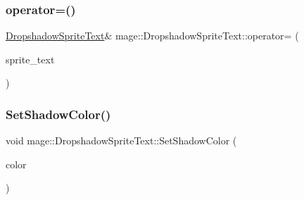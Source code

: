 \hypertarget{classmage_1_1_dropshadow_sprite_text_a8f2ff9363c2710d03c87d45de6ccabc0}{}\label{classmage_1_1_dropshadow_sprite_text_a8f2ff9363c2710d03c87d45de6ccabc0} 
\subsubsection{\texorpdfstring{operator=()}{operator=()}\hspace{0.1cm}{\footnotesize\ttfamily [2/2]}}
{\footnotesize\ttfamily \hyperlink{classmage_1_1_dropshadow_sprite_text}{Dropshadow\+Sprite\+Text}\& mage\+::\+Dropshadow\+Sprite\+Text\+::operator= (\begin{DoxyParamCaption}\item[{\hyperlink{classmage_1_1_dropshadow_sprite_text}{Dropshadow\+Sprite\+Text} \&\&}]{sprite\+\_\+text }\end{DoxyParamCaption})\hspace{0.3cm}{\ttfamily [default]}}

\hypertarget{classmage_1_1_dropshadow_sprite_text_abefcf9a3bd234df3996950410eefe1bf}{}\label{classmage_1_1_dropshadow_sprite_text_abefcf9a3bd234df3996950410eefe1bf} 
\subsubsection{\texorpdfstring{Set\+Shadow\+Color()}{SetShadowColor()}\hspace{0.1cm}{\footnotesize\ttfamily [1/2]}}
{\footnotesize\ttfamily void mage\+::\+Dropshadow\+Sprite\+Text\+::\+Set\+Shadow\+Color (\begin{DoxyParamCaption}\item[{const \hyperlink{structmage_1_1_color}{Color} \&}]{color }\end{DoxyParamCaption})}

\hypertarget{classmage_1_1_dropshadow_sprite_text_a8069cb327cc61dd92d516c793d9c49e7}{}\label{classmage_1_1_dropshadow_sprite_text_a8069cb327cc61dd92d516c793d9c49e7} 
